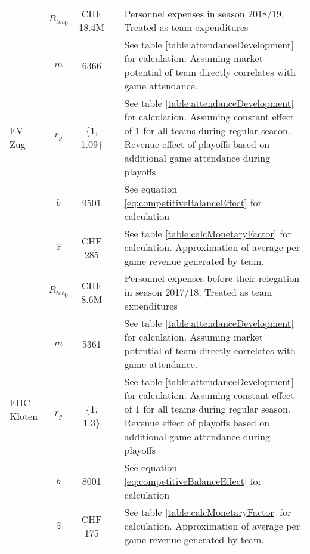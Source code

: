 \begin{longtable}[h!]{p{1.5cm}cc>{\baselineskip=13pt}p{3cm}>{\baselineskip=13pt}p{5.5cm}}
    \multirow[t]{5}{=}{EV Zug} & ${R_{tot}}_{0}$ & CHF 18.4M & \cite{evz_holding_ag_jahresbericht_2019} & 
    Personnel expenses in season 2018/19, Treated as team expenditures \\
                                                & $m$ & 6366 & \cite{national_league_zuschauerzahlen_2022} & See table \ref{table:attendanceDevelopment} for calculation. Assuming market potential of team directly correlates with game attendance. \\
                                                & $r_g$ & \{1, 1.09\} & \cite{national_league_zuschauerzahlen_2022} & See table \ref{table:attendanceDevelopment} for calculation. Assuming constant effect of 1 for all teams during regular season. Revenue effect of playoffs based on additional game attendance during playoffs \\
                                                & $b$ & 9501 &  & See equation \ref{eq:competitiveBalanceEffect} for calculation \\
                                                & $\hat{z}$ & CHF 285 &  & See table \ref{table:calcMonetaryFactor} for calculation. Approximation of average per game revenue generated by team. \\
    \midrule
    
    \multirow[t]{5}{=}{EHC Kloten} & ${R_{tot}}_{0}$ & CHF 8.6M &                                                                                            \cite{ehc_kloten_sport_ag_geschaftsbericht_2018} &                                          Personnel expenses before their relegation in season 2017/18, Treated as team expenditures \\
                                                    & $m$ & 5361 & \cite{national_league_zuschauerzahlen_2022} & See table \ref{table:attendanceDevelopment} for calculation. Assuming market potential of team directly correlates with game attendance. \\
                                                    & $r_g$ & \{1, 1.3\} & \cite{national_league_zuschauerzahlen_2022} & See table \ref{table:attendanceDevelopment} for calculation. Assuming constant effect of 1 for all teams during regular season. Revenue effect of playoffs based on additional game attendance during playoffs \\
                                                    & $b$ & 8001 &  & See equation \ref{eq:competitiveBalanceEffect} for calculation \\
                                                    & $\hat{z}$ & CHF 175 &  & See table \ref{table:calcMonetaryFactor} for calculation. Approximation of average per game revenue generated by team. \\
    

\end{longtable}
